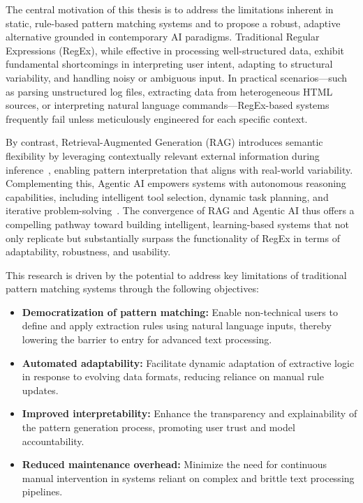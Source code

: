 The central motivation of this thesis is to address the limitations inherent in static, rule-based pattern matching systems and to propose a robust, adaptive alternative grounded in contemporary AI paradigms. Traditional Regular Expressions (RegEx), while effective in processing well-structured data, exhibit fundamental shortcomings in interpreting user intent, adapting to structural variability, and handling noisy or ambiguous input. In practical scenarios—such as parsing unstructured log files, extracting data from heterogeneous HTML sources, or interpreting natural language commands—RegEx-based systems frequently fail unless meticulously engineered for each specific context.

\vspace{0.5cm}

By contrast, Retrieval-Augmented Generation (RAG) introduces semantic flexibility by leveraging contextually relevant external information during inference~\cite{lewis2020rag}, enabling pattern interpretation that aligns with real-world variability. Complementing this, Agentic AI empowers systems with autonomous reasoning capabilities, including intelligent tool selection, dynamic task planning, and iterative problem-solving~\cite{shinn2023reflexion, wu2024agenttuning}. The convergence of RAG and Agentic AI thus offers a compelling pathway toward building intelligent, learning-based systems that not only replicate but substantially surpass the functionality of RegEx in terms of adaptability, robustness, and usability.

\vspace{0.5cm}

This research is driven by the potential to address key limitations of traditional pattern matching systems through the following objectives:

\begin{itemize}
    \item \textbf{Democratization of pattern matching:} Enable non-technical users to define and apply extraction rules using natural language inputs, thereby lowering the barrier to entry for advanced text processing.
    
    \item \textbf{Automated adaptability:} Facilitate dynamic adaptation of extractive logic in response to evolving data formats, reducing reliance on manual rule updates.
    
    \item \textbf{Improved interpretability:} Enhance the transparency and explainability of the pattern generation process, promoting user trust and model accountability.
    
    \item \textbf{Reduced maintenance overhead:} Minimize the need for continuous manual intervention in systems reliant on complex and brittle text processing pipelines.
\end{itemize}


